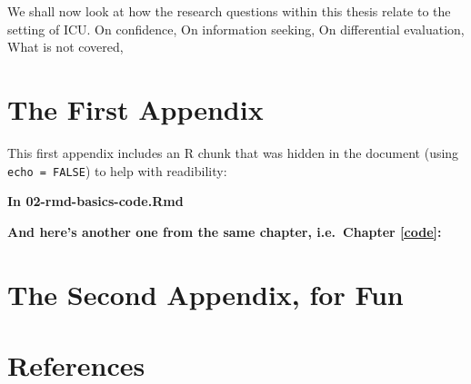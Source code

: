 \documentclass[a4paper, nobind]{templates/ociamthesis}
\newlength{\cslhangindent}
\newenvironment{CSLReferences}[2] %
 {%
  \setlength{\parindent}{0pt}
  \ifodd #1
  \let\oldpar\par
  \def\par{\hangindent=\cslhangindent\oldpar}
  \fi
  \setlength{\parskip}{1mm}
  \setlength{\baselineskip}{6mm}
 }%
 {}
\begin{document}
We shall now look at how the research questions within this thesis relate to the setting of ICU. On confidence,
On information seeking,
On differential evaluation,
What is not covered,

\startappendices

\chapter{The First Appendix}\label{the-first-appendix}

This first appendix includes an R chunk that was hidden in the document (using \texttt{echo\ =\ FALSE}) to help with readibility:

\textbf{In 02-rmd-basics-code.Rmd}

\textbf{And here's another one from the same chapter, i.e.~Chapter \ref{code}:}

\chapter{The Second Appendix, for Fun}\label{the-second-appendix-for-fun}

\chapter*{References}\label{references}


\label{refs}
\begin{CSLReferences}{0}{1}
\end{CSLReferences}

\end{document}
